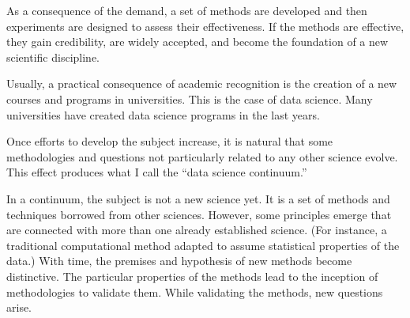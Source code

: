 As a consequence of the demand, a set of methods are developed and then experiments are
designed to assess their effectiveness.  If the methods are effective, they gain
credibility, are widely accepted, and become the foundation of a new scientific
discipline.

Usually, a practical consequence of academic recognition is the creation of a new courses
and programs in universities.  This is the case of data science.  Many universities have
created data science programs in the last years.

Once efforts to develop the subject increase, it is natural that some methodologies and
questions not particularly related to any other science evolve.  This effect produces what I
call the ``data science continuum.''

In a continuum, the subject is not a new science yet.  It is a set of methods and
techniques borrowed from other sciences.  However, some principles emerge that are
connected with more than one already established science.  (For instance, a traditional
computational method adapted to assume statistical properties of the data.)  With time,
the premises and hypothesis of new methods become distinctive.  The particular properties
of the methods lead to the inception of methodologies to validate them. While validating
the methods, new questions arise.

